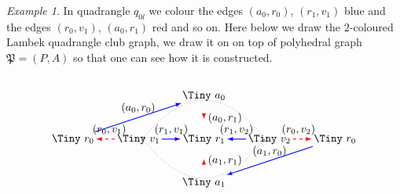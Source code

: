 \documentclass[12pt]{amsart}
\theoremstyle{definition}
\theoremstyle{remark}
\newtheorem{example}[thm]{Example}
\numberwithin{equation}{section}
\begin{document}
\begin{example}
\noindent
In quadrangle $q_{0l}$  we colour the edges $(a_0,r_0)$, $(r_1,v_1 )$ blue and the edges $(r_0,v_1)$, $(a_0,r_1)$ red and so on. Here below we draw the $2$-coloured Lambek quadrangle club graph,  we draw it on on top of polyhedral graph $\mathfrak{P}=(P,A)$ so that one can see how it is constructed. 
\begin{equation} \label{eq:c1-coloured}
\begin{array}{l}
\begin{tikzpicture}[->=stealth,scale=0.7]

\node[inner sep=1pt,circle] (p0) at (-3,0) {\Tiny $v_1$};
\node[inner sep=1pt,circle] (p1) at (3,0) {\Tiny $v_2$};

\node[inner sep=1pt,circle] (f0) at (0,0) {\Tiny $r_1$};

\node[inner sep=1pt,circle] (lf1) at (-6,0) {\Tiny $r_0$};
\node[inner sep=1pt,circle] (rf1) at (6,0) {\Tiny $r_0$};

\node[inner sep=1pt,circle] (a1) at (0,-2) {\Tiny $a_1$};
\node[inner sep=1pt,circle] (a0) at (0,2) {\Tiny $a_0$};


\draw[dotted] (2.8,0) parabola bend (0,1.8) (-2.8,0);

\draw[dotted] (-2.8,0) parabola bend (0,-1.8) (2.8,0);


\draw[thick,blue,-latex] (p0) -- (f0) node[pos=0.5,above] {\tiny\color{black}$(r_1,v_1)$};


\draw[dashed,red,thick,-latex] (p0) -- (lf1) node[pos=0.3,above] {\tiny\color{black}$(r_0,v_1)$};

\draw[thick,blue,-latex] (p1) -- (f0) node[pos=0.5,above] {\tiny\color{black}$(r_1,v_2)$};

\draw[red,dashed,thick,-latex] (p1) -- (rf1) node[pos=0.3,above] {\tiny\color{black}$(r_0,v_2)$};



\draw[thick,blue,-latex] (lf1) -- (a0) node[pos=0.5,above] {\tiny\color{black}$(a_0,r_0)$};

\draw[red,dashed,thick,-latex] (f0) -- (a0) node[pos=0.6,right] {\tiny\color{black}$(a_0,r_1)$};


\draw[blue,thick,-latex] (rf1) -- (a1) node[pos=0.5,above] {\tiny\color{black}$(a_1,r_0)$};

\draw[red,dashed,thick,-latex] (f0) -- (a1) node[pos=0.6,right] {\tiny\color{black}$(a_1,r_1)$};




\end{tikzpicture}
\end{array}
\end{equation}
\end{example}
\end{document}
